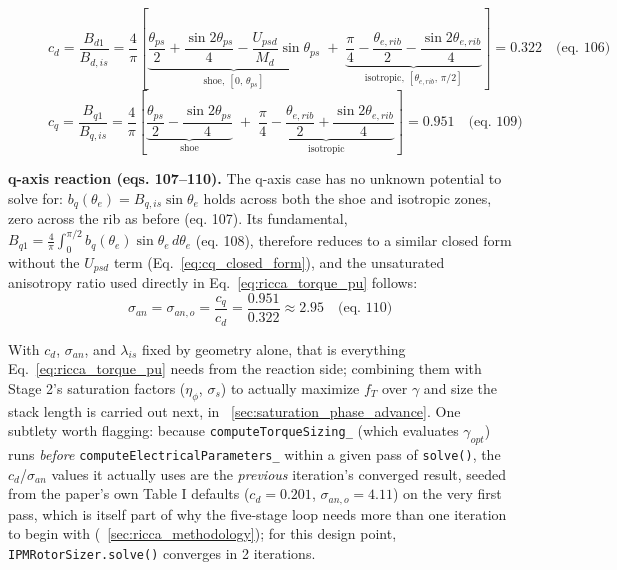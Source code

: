 \documentclass[10pt,final,journal,a4paper,oneside,twocolumn]{IEEEtran}
\begin{document}
\begin{figure}[!t]
\normalsize
\begin{equation}
\label{eq:cd_closed_form}
c_d = \frac{B_{d1}}{B_{d,is}} = \frac{4}{\pi}\left[\underbrace{\frac{\theta_{ps}}{2}+\frac{\sin2\theta_{ps}}{4}-\frac{U_{psd}}{M_d}\sin\theta_{ps}}_{\text{shoe},\ [0,\,\theta_{ps}]} \;+\; \underbrace{\frac{\pi}{4}-\frac{\theta_{e,rib}}{2}-\frac{\sin2\theta_{e,rib}}{4}}_{\text{isotropic},\ [\theta_{e,rib},\,\pi/2]}\right] = 0.322 \quad\text{(eq. 106)}
\end{equation}
\begin{equation}
\label{eq:cq_closed_form}
c_q = \frac{B_{q1}}{B_{q,is}} = \frac{4}{\pi}\left[\underbrace{\frac{\theta_{ps}}{2}-\frac{\sin2\theta_{ps}}{4}}_{\text{shoe}} \;+\; \underbrace{\frac{\pi}{4}-\frac{\theta_{e,rib}}{2}+\frac{\sin2\theta_{e,rib}}{4}}_{\text{isotropic}}\right] = 0.951 \quad\text{(eq. 109)}
\end{equation}
\hrulefill
\vspace*{4pt}
\end{figure}

\textbf{q-axis reaction (eqs. 107--110).} The q-axis case has no unknown potential to solve for: $b_q(\theta_e)=B_{q,is}\sin\theta_e$ holds across both the shoe and isotropic zones, zero across the rib as before (eq. 107). Its fundamental, $B_{q1}=\frac{4}{\pi}\int_0^{\pi/2}b_q(\theta_e)\sin\theta_e\,d\theta_e$ (eq. 108), therefore reduces to a similar closed form without the $U_{psd}$ term (Eq.~\ref{eq:cq_closed_form}), and the unsaturated anisotropy ratio used directly in Eq.~\ref{eq:ricca_torque_pu} follows:
\begin{equation}
\label{eq:sigma_an}
\sigma_{an} = \sigma_{an,o} = \frac{c_q}{c_d} = \frac{0.951}{0.322} \approx 2.95 \quad\text{(eq. 110)}
\end{equation}

With $c_d$, $\sigma_{an}$, and $\lambda_{is}$ fixed by geometry alone, that is everything Eq.~\ref{eq:ricca_torque_pu} needs from the reaction side; combining them with Stage 2's saturation factors ($\eta_\phi$, $\sigma_s$) to actually maximize $f_T$ over $\gamma$ and size the stack length is carried out next, in \sectionname~\ref{sec:saturation_phase_advance}. One subtlety worth flagging: because \texttt{computeTorqueSizing\_} (which evaluates $\gamma_{opt}$) runs \emph{before} \texttt{computeElectricalParameters\_} within a given pass of \texttt{solve()}, the $c_d$/$\sigma_{an}$ values it actually uses are the \emph{previous} iteration's converged result, seeded from the paper's own Table I defaults ($c_d=0.201$, $\sigma_{an,o}=4.11$) on the very first pass, which is itself part of why the five-stage loop needs more than one iteration to begin with (\sectionname~\ref{sec:ricca_methodology}); for this design point, \texttt{IPMRotorSizer.solve()} converges in 2 iterations.
\end{document}
